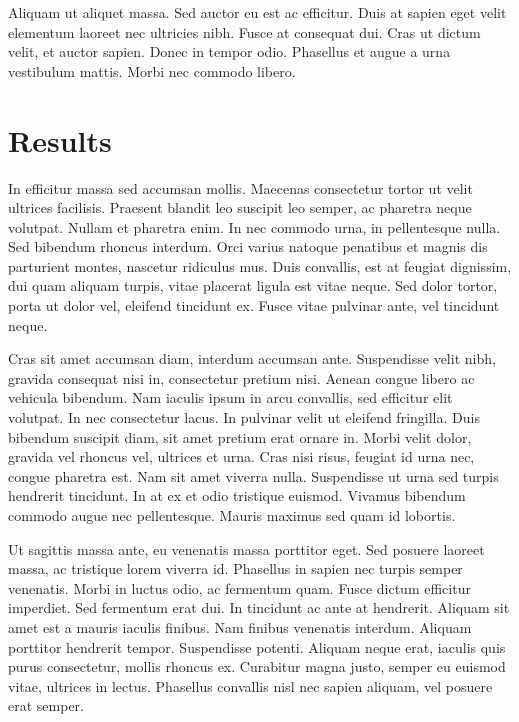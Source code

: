 \documentclass{OP-Whitepaper}
\begin{document}
\begin{multicols}{2}
Aliquam ut aliquet massa. Sed auctor eu est ac efficitur. Duis at sapien eget velit elementum laoreet nec ultricies nibh. Fusce at consequat dui. Cras ut dictum velit, et auctor sapien. Donec in tempor odio. Phasellus et augue a urna vestibulum mattis. Morbi nec commodo libero.

\section{Results}

In efficitur massa sed accumsan mollis. Maecenas consectetur tortor ut velit ultrices facilisis. Praesent blandit leo suscipit leo semper, ac pharetra neque volutpat. Nullam et pharetra enim. In nec commodo urna, in pellentesque nulla. Sed bibendum rhoncus interdum. Orci varius natoque penatibus et magnis dis parturient montes, nascetur ridiculus mus. Duis convallis, est at feugiat dignissim, dui quam aliquam turpis, vitae placerat ligula est vitae neque. Sed dolor tortor, porta ut dolor vel, eleifend tincidunt ex. Fusce vitae pulvinar ante, vel tincidunt neque.

Cras sit amet accumsan diam, interdum accumsan ante. Suspendisse velit nibh, gravida consequat nisi in, consectetur pretium nisi. Aenean congue libero ac vehicula bibendum. Nam iaculis ipsum in arcu convallis, sed efficitur elit volutpat. In nec consectetur lacus. In pulvinar velit ut eleifend fringilla. Duis bibendum suscipit diam, sit amet pretium erat ornare in. Morbi velit dolor, gravida vel rhoncus vel, ultrices et urna. Cras nisi risus, feugiat id urna nec, congue pharetra est. Nam sit amet viverra nulla. Suspendisse ut urna sed turpis hendrerit tincidunt. In at ex et odio tristique euismod. Vivamus bibendum commodo augue nec pellentesque. Mauris maximus sed quam id lobortis.

Ut sagittis massa ante, eu venenatis massa porttitor eget. Sed posuere laoreet massa, ac tristique lorem viverra id. Phasellus in sapien nec turpis semper venenatis. Morbi in luctus odio, ac fermentum quam. Fusce dictum efficitur imperdiet. Sed fermentum erat dui. In tincidunt ac ante at hendrerit. Aliquam sit amet est a mauris iaculis finibus. Nam finibus venenatis interdum. Aliquam porttitor hendrerit tempor. Suspendisse potenti. Aliquam neque erat, iaculis quis purus consectetur, mollis rhoncus ex. Curabitur magna justo, semper eu euismod vitae, ultrices in lectus. Phasellus convallis nisl nec sapien aliquam, vel posuere erat semper. 

\printbibliography{}

\end{multicols}
\end{document}
